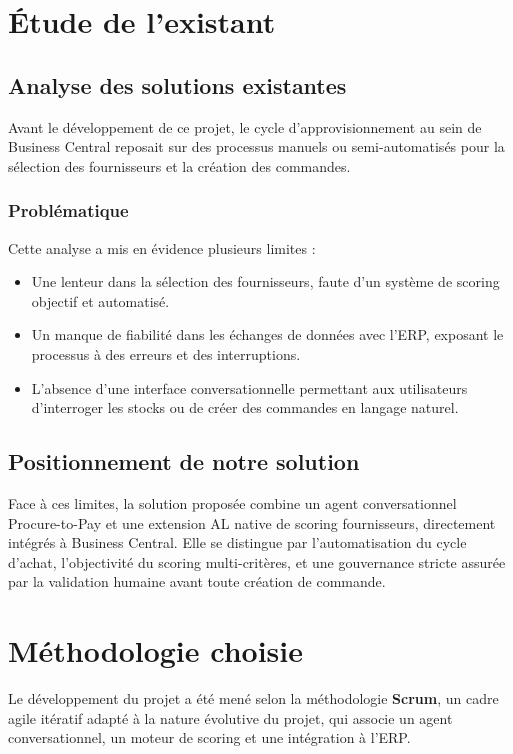\section{Étude de l'existant}

\subsection{Analyse des solutions existantes}
Avant le développement de ce projet, le cycle d'approvisionnement au sein de Business Central reposait sur des processus manuels ou semi-automatisés pour la sélection des fournisseurs et la création des commandes.

\subsubsection{Problématique}
Cette analyse a mis en évidence plusieurs limites :
\begin{itemize}
    \item Une lenteur dans la sélection des fournisseurs, faute d'un système de scoring objectif et automatisé.
    \item Un manque de fiabilité dans les échanges de données avec l'ERP, exposant le processus à des erreurs et des interruptions.
    \item L'absence d'une interface conversationnelle permettant aux utilisateurs d'interroger les stocks ou de créer des commandes en langage naturel.
\end{itemize}

\subsection{Positionnement de notre solution}
Face à ces limites, la solution proposée combine un agent conversationnel Procure-to-Pay et une extension AL native de scoring fournisseurs, directement intégrés à Business Central. Elle se distingue par l'automatisation du cycle d'achat, l'objectivité du scoring multi-critères, et une gouvernance stricte assurée par la validation humaine avant toute création de commande.


\section{Méthodologie choisie}
Le développement du projet a été mené selon la méthodologie \textbf{Scrum}, un cadre agile itératif adapté à la nature évolutive du projet, qui associe un agent conversationnel, un moteur de scoring et une intégration à l'ERP.
 
